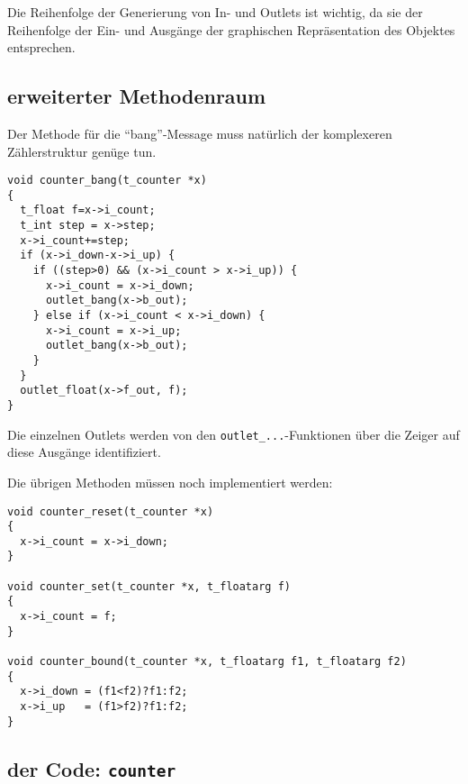 \documentclass[12pt, a4paper,austrian, titlepage]{article}
\begin{document}
Die Reihenfolge der Generierung von In- und Outlets ist wichtig,
da sie der Reihenfolge der Ein- und Ausgänge der graphischen Repräsentation
des Objektes entsprechen.

\subsection{erweiterter Methodenraum}

Der Methode für die ``bang''-Message muss natürlich der komplexeren Zählerstruktur
genüge tun.


\begin{verbatim}
void counter_bang(t_counter *x)
{
  t_float f=x->i_count;
  t_int step = x->step;
  x->i_count+=step;
  if (x->i_down-x->i_up) {
    if ((step>0) && (x->i_count > x->i_up)) {
      x->i_count = x->i_down;
      outlet_bang(x->b_out);
    } else if (x->i_count < x->i_down) {
      x->i_count = x->i_up;
      outlet_bang(x->b_out);
    }
  }
  outlet_float(x->f_out, f);
}
\end{verbatim}

Die einzelnen Outlets werden von den \verb+outlet_...+-Funktionen über
die Zeiger auf diese Ausgänge identifiziert.

Die übrigen Methoden müssen noch implementiert werden:

\begin{verbatim}
void counter_reset(t_counter *x)
{
  x->i_count = x->i_down;
}

void counter_set(t_counter *x, t_floatarg f)
{
  x->i_count = f;
}

void counter_bound(t_counter *x, t_floatarg f1, t_floatarg f2)
{
  x->i_down = (f1<f2)?f1:f2;
  x->i_up   = (f1>f2)?f1:f2;
}
\end{verbatim}

\subsection{der Code: \tt counter}
\end{document}
